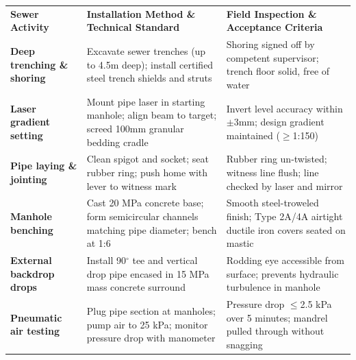 {\fontsize{7.7pt}{9.8pt}\selectfont
\renewcommand{\arraystretch}{1.23}
\noindent
\begin{tabularx}{\textwidth}{@{}p{3.3cm} p{6.6cm} X@{}}
\rowcolor{mhnavy}
{\color{white}\bfseries Sewer Activity} & {\color{white}\bfseries Installation Method \& Technical Standard} & {\color{white}\bfseries Field Inspection \& Acceptance Criteria} \\
\rowcolor{mhbluelight}
\bfseries Deep trenching \& shoring & Excavate sewer trenches (up to 4.5m deep); install certified steel trench shields and struts & Shoring signed off by competent supervisor; trench floor solid, free of water \\
\bfseries Laser gradient setting & Mount pipe laser in starting manhole; align beam to target; screed 100mm granular bedding cradle & Invert level accuracy within $\pm$3mm; design gradient maintained ($\ge$1:150) \\
\rowcolor{mhbluelight}
\bfseries Pipe laying \& jointing & Clean spigot and socket; seat rubber ring; push home with lever to witness mark & Rubber ring un-twisted; witness line flush; line checked by laser and mirror \\
\bfseries Manhole benching & Cast 20 MPa concrete base; form semicircular channels matching pipe diameter; bench at 1:6 & Smooth steel-troweled finish; Type 2A/4A airtight ductile iron covers seated on mastic \\
\rowcolor{mhbluelight}
\bfseries External backdrop drops & Install 90$^\circ$ tee and vertical drop pipe encased in 15 MPa mass concrete surround & Rodding eye accessible from surface; prevents hydraulic turbulence in manhole \\
\bfseries Pneumatic air testing & Plug pipe section at manholes; pump air to 25 kPa; monitor pressure drop with manometer & Pressure drop $\le$2.5 kPa over 5 minutes; mandrel pulled through without snagging \\
\end{tabularx}
\renewcommand{\arraystretch}{1}
}

\vfill

